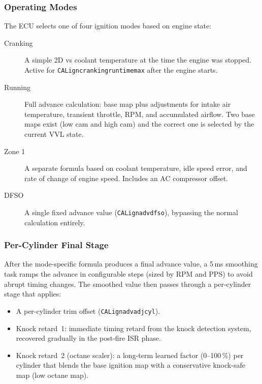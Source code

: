 \documentclass[a4paper,11pt]{article}
\renewcommand{\_}{\oldunderscore\allowbreak}
\begin{document}
\subsubsection*{Operating Modes}

The ECU selects one of four ignition modes based on engine state:

\begin{description}
	\item[Cranking] A simple 2D vs coolant temperature at the time the
	      engine was stopped. Active for
	      \texttt{CAL\_ign\_cranking\_runtime\_max} after the engine starts.
	\item[Running] Full advance calculation: base map plus adjustments for
	      intake air temperature, transient throttle, RPM, and accumulated
	      airflow. Two base maps exist (low cam and high cam) and the correct
	      one is selected by the current VVL state.
	\item[Zone 1] A separate formula based on coolant temperature, idle speed
	      error, and rate of change of engine speed. Includes an AC compressor
	      offset.
	\item[DFSO] A single fixed advance value (\texttt{CAL\_ign\_adv\_dfso}),
	      bypassing the normal calculation entirely.
\end{description}

\subsubsection*{Per-Cylinder Final Stage}

After the mode-specific formula produces a final advance value, a 5\,ms
smoothing task ramps the advance in configurable steps (sized by RPM and PPS)
to avoid abrupt timing changes. The smoothed value then passes through a
per-cylinder stage that applies:

\begin{itemize}
	\item A per-cylinder trim offset (\texttt{CAL\_ign\_adv\_adj\_cyl}).
	\item Knock retard~1: immediate timing retard from the knock detection
	      system, recovered gradually in the post-fire ISR phase.
	\item Knock retard~2 (octane scaler): a long-term learned factor
	      (0--100\,\%) per cylinder that blends the base ignition map with
	      a conservative knock-safe map (low octane map).
\end{itemize}
\end{document}
